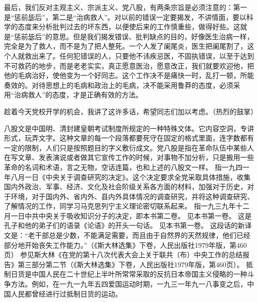 最后，我们反对主观主义、宗派主义、党八股，有两条宗旨是必须注意的：第一是“惩前毖后”，第二是“治病救人”。对以前的错误一定要揭发，不讲情面，要以科学的态度来分析批判过去的坏东西，以便使后来的工作慎重些，做得好些。这就是“惩前毖后”的意思。但是我们揭发错误、批判缺点的目的，好像医生治病一样，完全是为了救人，而不是为了把人整死。一个人发了阑尾炎，医生把阑尾割了，这个人就救出来了。任何犯错误的人，只要他不讳疾忌医，不固执错误，以至于达到不可救药的地步，而是老老实实，真正愿意医治，愿意改正，我们就要欢迎他，把他的毛病治好，使他变为一个好同志。这个工作决不是痛快一时，乱打一顿，所能奏效的。对待思想上的毛病和政治上的毛病，决不能采用鲁莽的态度，必须采用“治病救人”的态度，才是正确有效的方法。

趁着今天党校开学的机会，我讲了这许多话，希望同志们加以考虑。（热烈的鼓掌）


\begin{maonote}
八股文是中国明、清封建皇朝考试制度所规定的一种特殊文体。它内容空洞，专讲形式，玩弄文字。这种文章的每一个段落都要死守在固定的格式里面，连字数都有一定的限制，人们只是按照题目的字义敷衍成文。党八股是指在革命队伍中某些人在写文章、发表演说或者做其它宣传工作的时候，对事物不加分析，只是搬用一些革命的名词和术语，言之无物，空话连篇，也和上述的八股文一样。
指一九四一年八月一日《中央关于调查研究的决定》。这个决定要求全党采取具体措施，收集国内外政治、军事、经济、文化及社会阶级关系各方面的材料，加强对于历史，对于环境，对于国内外、省内外、县内外具体情况的调查研究，并将这种调查研究、了解情况的工作，同学习马克思列宁主义理论密切联系起来。
指一九三九年十二月一日中共中央关于吸收知识分子的决定，即本书第二卷。
见本书第一卷。
这是孔子和他的弟子们的语录《论语》的开头一句话。
见本书第一卷。
这段话的新译文是：“老干部总是少数，不能满足需要，而且由于自然界的天然规律，他们已经部分地开始丧失工作能力。”（《斯大林选集》下卷，人民出版社1979年版，第460页）
参见斯大林《在党的第十八次代表大会上关于联共（布）中央工作的总结报告》第三部分第二节（《斯大林选集》下卷，人民出版社1979年版，第460页）。
抵制日货是中国人民在二十世纪上半叶所常常采取的反抗日本帝国主义侵略的一种斗争方法。例如，在一九一九年五四爱国运动时期，一九三一年九一八事变之后，中国人民都曾经进行过抵制日货的运动。
\end{maonote}
